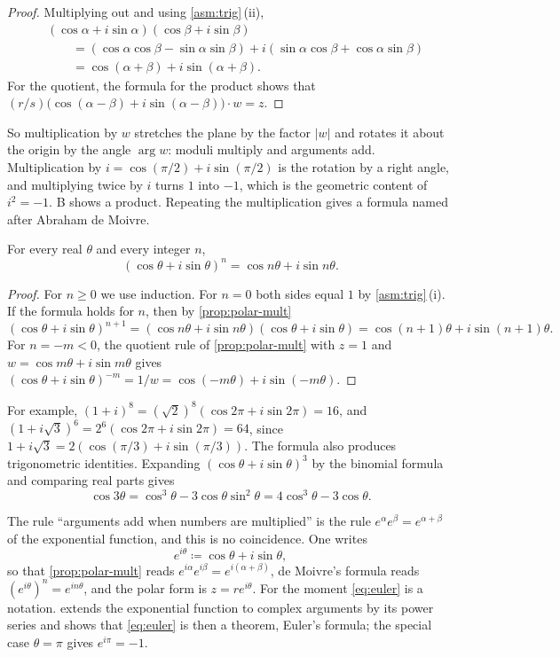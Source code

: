 \begin{proof}
Multiplying out and using \cref{asm:trig}\,(ii),
\begin{align*}
&(\cos\alpha+i\sin\alpha)(\cos\beta+i\sin\beta)\\
&\qquad=(\cos\alpha\cos\beta-\sin\alpha\sin\beta)+i(\sin\alpha\cos\beta+\cos\alpha\sin\beta)\\
&\qquad=\cos(\alpha+\beta)+i\sin(\alpha+\beta).
\end{align*}
For the quotient, the formula for the product shows that $(r/s)\bigl(\cos(\alpha-\beta)+i\sin(\alpha-\beta)\bigr)\cdot w=z$.
\end{proof}

So multiplication by $w$ stretches the plane by the factor $|w|$ and rotates it about the origin by the angle $\arg w$: moduli multiply and arguments add. Multiplication by $i=\cos(\pi/2)+i\sin(\pi/2)$ is the rotation by a right angle, and multiplying twice by $i$ turns $1$ into $-1$, which is the geometric content of $i^2=-1$. B shows a product. Repeating the multiplication gives a formula named after Abraham de Moivre.

\begin{theorem}
\label{thm:de-moivre}
For every real $\theta$ and every integer $n$,
\[
(\cos\theta+i\sin\theta)^n=\cos n\theta+i\sin n\theta .
\]
\end{theorem}

\begin{proof}
For $n\ge0$ we use induction. For $n=0$ both sides equal $1$ by \cref{asm:trig}\,(i). If the formula holds for $n$, then by \cref{prop:polar-mult}
\[
(\cos\theta+i\sin\theta)^{n+1}=(\cos n\theta+i\sin n\theta)(\cos\theta+i\sin\theta)=\cos(n+1)\theta+i\sin(n+1)\theta .
\]
For $n=-m<0$, the quotient rule of \cref{prop:polar-mult} with $z=1$ and $w=\cos m\theta+i\sin m\theta$ gives $(\cos\theta+i\sin\theta)^{-m}=1/w=\cos(-m\theta)+i\sin(-m\theta)$.
\end{proof}

For example, $(1+i)^8=(\sqrt2)^8(\cos2\pi+i\sin2\pi)=16$, and $(1+i\sqrt3)^6=2^6(\cos2\pi+i\sin2\pi)=64$, since $1+i\sqrt3=2(\cos(\pi/3)+i\sin(\pi/3))$. The formula also produces trigonometric identities. Expanding $(\cos\theta+i\sin\theta)^3$ by the binomial formula and comparing real parts gives
\[
\cos3\theta=\cos^3\theta-3\cos\theta\sin^2\theta=4\cos^3\theta-3\cos\theta .
\]

The rule ``arguments add when numbers are multiplied'' is the rule $e^\alpha e^\beta=e^{\alpha+\beta}$ of the exponential function, and this is no coincidence. One writes
\begin{equation}
e^{i\theta}\coloneqq\cos\theta+i\sin\theta ,
\label{eq:euler}
\end{equation}
so that \cref{prop:polar-mult} reads $e^{i\alpha}e^{i\beta}=e^{i(\alpha+\beta)}$, de Moivre's formula reads $(e^{i\theta})^n=e^{in\theta}$, and the polar form is $z=re^{i\theta}$. For the moment \eqref{eq:euler} is a notation.  extends the exponential function to complex arguments by its power series and shows that \eqref{eq:euler} is then a theorem, Euler's formula; the special case $\theta=\pi$ gives $e^{i\pi}=-1$.

